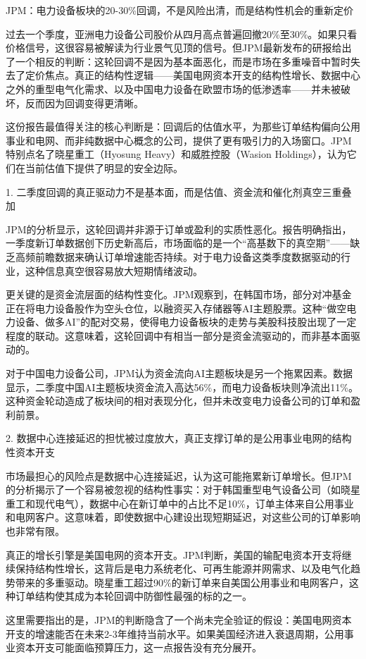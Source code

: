 \documentclass[11pt]{ctexart}
\begin{document}
JPM：电力设备板块的20-30\%回调，不是风险出清，而是结构性机会的重新定价

过去一个季度，亚洲电力设备公司股价从四月高点普遍回撤20\%至30\%。如果只看价格信号，这很容易被解读为行业景气见顶的信号。但JPM最新发布的研报给出了一个相反的判断：这轮回调不是因为基本面恶化，而是市场在多重噪音中暂时失去了定价焦点。真正的结构性逻辑——美国电网资本开支的结构性增长、数据中心之外的重型电气化需求、以及中国电力设备在欧盟市场的低渗透率——并未被破坏，反而因为回调变得更清晰。

这份报告最值得关注的核心判断是：回调后的估值水平，为那些订单结构偏向公用事业和电网、而非纯数据中心概念的公司，提供了更有吸引力的入场窗口。JPM特别点名了晓星重工（Hyosung Heavy）和威胜控股（Wasion Holdings），认为它们在当前估值下提供了明显的安全边际。

1. 二季度回调的真正驱动力不是基本面，而是估值、资金流和催化剂真空三重叠加

JPM的分析显示，这轮回调并非源于订单或盈利的实质性恶化。报告明确指出，一季度新订单数据创下历史新高后，市场面临的是一个“高基数下的真空期”——缺乏高频前瞻数据来确认订单增速能否持续。对于电力设备这类季度数据驱动的行业，这种信息真空很容易放大短期情绪波动。

更关键的是资金流层面的结构性变化。JPM观察到，在韩国市场，部分对冲基金正在将电力设备股作为空头仓位，以融资买入存储器等AI主题股票。这种“做空电力设备、做多AI”的配对交易，使得电力设备板块的走势与美股科技股出现了一定程度的联动。这意味着，这轮回调中有相当一部分是资金流驱动的，而非基本面驱动的。

对于中国电力设备公司，JPM认为资金流向AI主题板块是另一个拖累因素。数据显示，二季度中国AI主题板块资金流入高达56\%，而电力设备板块则净流出11\%。这种资金轮动造成了板块间的相对表现分化，但并未改变电力设备公司的订单和盈利前景。

2. 数据中心连接延迟的担忧被过度放大，真正支撑订单的是公用事业电网的结构性资本开支

市场最担心的风险点是数据中心连接延迟，认为这可能拖累新订单增长。但JPM的分析揭示了一个容易被忽视的结构性事实：对于韩国重型电气设备公司（如晓星重工和现代电气），数据中心在新订单中的占比不足10\%，订单主体来自公用事业和电网客户。这意味着，即使数据中心建设出现短期延迟，对这些公司的订单影响也非常有限。

真正的增长引擎是美国电网的资本开支。JPM判断，美国的输配电资本开支将继续保持结构性增长，这背后是电力系统老化、可再生能源并网需求、以及电气化趋势带来的多重驱动。晓星重工超过90\%的新订单来自美国公用事业和电网客户，这种订单结构使其成为本轮回调中防御性最强的标的之一。

这里需要指出的是，JPM的判断隐含了一个尚未完全验证的假设：美国电网资本开支的增速能否在未来2-3年维持当前水平。如果美国经济进入衰退周期，公用事业资本开支可能面临预算压力，这一点报告没有充分展开。
\end{document}

